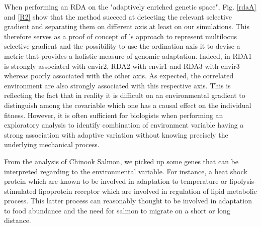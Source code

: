 \documentclass[nogrid]{MBE}%
\begin{document}
When performing an RDA on the "adaptively enriched genetic space", Fig. \ref{rdaA} and \ref{R2} show that the method succeed at detecting the relevant selective gradient and separating them on different axis at least on our simulations. This therefore serves as a proof of concept of \citet{Steane2014a}'s approach to represent multilocus selective gradient and the possibility to use the ordination axis it to devise a metric that provides a holistic measure of genomic adaptation. Indeed, in RDA1 is strongly associated with envir2, RDA2 with envir1 and RDA3 with envir3 whereas poorly associated with the other axis. As expected, the correlated environment are also strongly associated with this respective axis. This is reflecting the fact that in reality it is difficult on an environmental gradient to distinguish  among the covariable which one has a causal effect on the individual fitness. However, it is often sufficient for biologists when performing an exploratory analysis to identify combination of environment variable having a strong association with adaptive variation without knowing precisely the underlying mechanical process.

From the analysis of Chinook Salmon, we picked up some genes that can be interpreted regarding to the environmental variable. For instance, a heat shock protein which are known to be involved in adaptation to temperature or lipolysis-stimulated lipoprotein receptor which are involved in regulation of lipid metabolic process. This latter process can reasonably thought to be involved in adaptation to food abundance and the need for salmon to migrate on a short or long distance.
\end{document}
